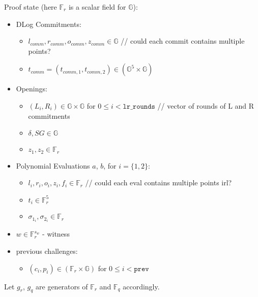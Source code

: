 Proof state (here $\mathbb{F}_r$ is a scalar field for $\mathbb{G}$):
\begin{itemize}
	\item DLog Commitments:
	\begin{itemize}
		\item $l_{comm}, r_{comm}, o_{comm}, z_{comm} \in \mathbb{G}$ // could each commit contains multiple points?
		\item $t_{comm} = (t_{comm, 1}, t_{comm, 2}) \in (\mathbb{G}^5 \times \mathbb{G})$
	\end{itemize}
	\item Openings:
	\begin{itemize}
		\item $(L_i, R_i) \in \mathbb{G} \times \mathbb{G}$ for $0 \leq i < \texttt{lr\_rounds}$ // vector of rounds of L and R commitments
		\item $\delta, SG \in \mathbb{G}$
		\item $z_1, z_2 \in \mathbb{F}_{r}$
	\end{itemize}
	\item Polynomial Evaluations $a$, $b$, for $i = \{1, 2\}$:
	\begin{itemize}
		\item $l_i, r_i, o_i, z_i, f_i \in \mathbb{F}_r$ // could each eval contains multiple points irl?
		\item $t_i \in \mathbb{F}_r^5$
		\item $\sigma_{1_i}, \sigma_{2_i} \in \mathbb{F}_r$
	\end{itemize}
	\item $w \in \mathbb{F}_r^{s_w}$ - witness
	\item previous challenges:
	\begin{itemize}
		\item $(c_i, p_i) \in (\mathbb{F}_r \times \mathbb{G})$ for $0 \leq i < \texttt{prev}$
	\end{itemize}
\end{itemize}

Let $g_r$, $g_q$ are generators of $\mathbb{F}_r$ and $\mathbb{F}_q$ accordingly.

